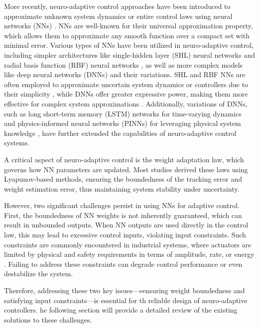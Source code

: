 \documentclass[lettersize,journal]{IEEEtran}
\begin{document}
More recently, neuro-adaptive control approaches have been introduced to approximate unknown system dynamics or entire control laws using neural networks (NNs) \cite{Farrell:2006aa}. 
NNs are well-known for their universal approximation property, which allows them to approximate any smooth function over a compact set with minimal error. 
Various types of NNs have been utilized in neuro-adaptive control, including simpler architectures like single-hidden layer (SHL) neural networks \cite{Ge:2010aa, Yesildirek:1995aa} and radial basis function (RBF) neural networks \cite{Liu:2013ab,Ge:2002aa}, as well as more complex models like deep neural networks (DNNs) \cite{Patil:2022aa} and their variations. 
SHL and RBF NNs are often employed to approximate uncertain system dynamics or controllers due to their simplicity \cite{Esfandiari:2014aa,Esfandiari:2015aa,Yesildirek:1995aa,Gao:2006aa}, while DNNs offer greater expressive power, making them more effective for complex system approximations \cite{Rolnick:2018aa}. 
Additionally, variations of DNNs, such as long short-term memory (LSTM) networks for time-varying dynamics \cite{Liu:2013ab} and physics-informed neural networks (PINNs) for leveraging physical system knowledge \cite{Hart:2024aa}, have further extended the capabilities of neuro-adaptive control systems.

A critical aspect of neuro-adaptive control is the weight adaptation law, which governs how NN parameters are updated. 
Most studies derived these laws using Lyapunov-based methods, ensuring the boundedness of the tracking error and weight estimation error, thus maintaining system stability under uncertainty.

However, two significant challenges persist in using NNs for adaptive control. 
First, the boundedness of NN weights is not inherently guaranteed, which can result in unbounded outputs. 
When NN outputs are used directly in the control law, this may lead to excessive control inputs, violating input constraints. 
Such constraints are commonly encountered in industrial systems, where actuators are limited by physical and safety requirements in terms of amplitude, rate, or energy \cite{Esfandiari:2021aa}. 
Failing to address these constraints can degrade control performance or even destabilize the system.

Therefore, addressing these two key issues—eensuring weight boundedness and satisfying input constraints—is essential for th reliable design of neuro-adaptive controllers. 
he following section will provide a detailed review of the existing solutions to these challenges.
\end{document}
